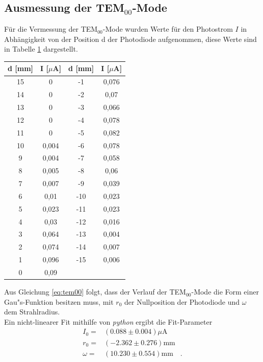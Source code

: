 \documentclass[captions=tableheading]{scrartcl}
\begin{document}
\subsection{Ausmessung der TEM$_{00}$-Mode}
Für die Vermessung der TEM$_{00}$-Mode wurden Werte für den Photostrom $I$ in Abhängigkeit von der Position d der Photodiode aufgenommen, diese Werte sind in Tabelle \ref{tab:tem00} dargestellt.
\begin{table}
	\centering
	\label{tab:tem00}
	\begin{tabular}{c c c c}
		\toprule
				 d [mm] & I [$\mu$A] & d [mm] & I [$\mu$A]\\
		\midrule
				15	&	0	&	-1	&	0,076	\\
				14	&	0	&	-2	&	0,07	\\
				13	&	0	&	-3	&	0,066	\\
				12	&	0	&	-4	&	0,078	\\
				11	&	0	&	-5	&	0,082	\\
				10	&	0,004	&	-6	&	0,078	\\
				9	&	0,004	&	-7	&	0,058	\\
				8	&	0,005	&	-8	&	0,06	\\
				7	&	0,007	&	-9	&	0,039	\\
				6	&	0,01	&	-10	&	0,023	\\
				5	&	0,023	&	-11	&	0,023	\\
				4	&	0,03	&	-12	&	0,016	\\
				3	&	0,064	&	-13	&	0,004	\\
				2	&	0,074	&	-14	&	0,007	\\
				1	&	0,096	&	-15	&	0,006	\\
				0	&	0,09	&		&		\\
		\bottomrule
	\end{tabular}
\end{table}
Aus Gleichung \ref{eq:tem00} folgt, dass der Verlauf der TEM$_{00}$-Mode die Form einer Gau"s-Funktion besitzen muss, mit $r_0$ der Nullposition der Photodiode und $\omega$ dem Strahlradius. \\
Ein nicht-linearer Fit mithilfe von \textit{python} ergibt die Fit-Parameter
\begin{align*}
I_0=& (0.088 \pm 0.004) \si{\mu\ampere}\\
r_0=& (-2.362 \pm 0.276) \si{\milli\metre}\\
\omega=&  (10.230  \pm 0.554) \si{\milli\metre}\quad.
\end{align*}
\end{document}

